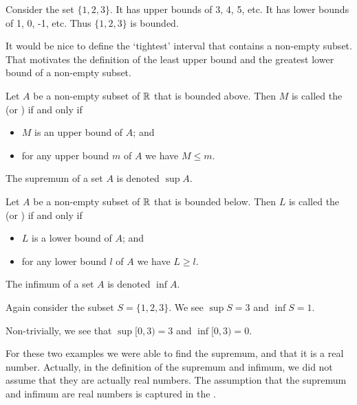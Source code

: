 \begin{example}
    Consider the set $\{1, 2, 3\}$. It has upper bounds of 3, 4, 5, etc. It has lower bounds of 1, 0, -1, etc. Thus $\{1, 2, 3\}$ is bounded.
\end{example}

It would be nice to define the `tightest' interval that contains a non-empty subset. That motivates the definition of the least upper bound and the greatest lower bound of a non-empty subset.

\begin{definition}
    Let $A$ be a non-empty subset of $\mathbb{R}$ that is bounded above. Then $M$ is called the  (or ) if and only if
    \begin{itemize}
        \item $M$ is an upper bound of $A$; and
        \item for any upper bound $m$ of $A$ we have $M \leq m$.
    \end{itemize}
    The supremum of a set $A$ is denoted $\sup A$.
\end{definition}

\begin{definition}
    Let $A$ be a non-empty subset of $\mathbb{R}$ that is bounded below. Then $L$ is called the  (or ) if and only if
    \begin{itemize}
        \item $L$ is a lower bound of $A$; and
        \item for any lower bound $l$ of $A$ we have $L \geq l$.
    \end{itemize}
    The infimum of a set $A$ is denoted $\inf A$.
\end{definition}

\begin{example}
    Again consider the subset $S = \{1, 2, 3\}$. We see $\sup S = 3$ and $\inf S = 1$.
\end{example}

\begin{example}
    Non-trivially, we see that $\sup [0, 3) = 3$ and $\inf [0, 3) = 0$.
\end{example}

For these two examples we were able to find the supremum, and that it is a real number. Actually, in the definition of the supremum and infimum, we did not assume that they are actually real numbers. The assumption that the supremum and infimum are real numbers is captured in the .

